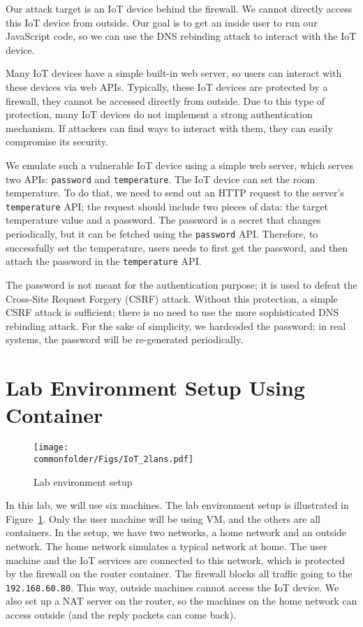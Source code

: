 Our attack target is an IoT device behind the firewall. We cannot directly
access this IoT device from outside. Our goal is to get an inside
user to run our JavaScript code, so we can use
the DNS rebinding attack to interact with the IoT device.


Many IoT devices have a simple built-in web server, so users can
interact with these devices via web APIs. Typically, these IoT
devices are protected by a firewall, they cannot be accessed directly
from outside. Due to this type of protection,  many IoT devices do not
implement a strong authentication mechanism. If attackers can find ways
to interact with them, they can easily compromise its security.

We emulate such a vulnerable IoT device using 
a simple web server, which serves
two APIs: \texttt{password} and \texttt{temperature}.
The IoT device can set the room temperature. To do that,
we need to send out an HTTP request to the server's
\texttt{temperature} API; the request should include
two pieces of data: the target temperature value and a
password.  The password is a secret that changes
periodically, but it can be fetched using
the \texttt{password} API. Therefore, to successfully
set the temperature, users needs to
first get the password, and then attach the password
in the \texttt{temperature} API.

The password is not meant for the authentication purpose; it is used to defeat the Cross-Site
Request Forgery (CSRF) attack. Without this protection, a simple CSRF attack is sufficient;
there is no need to use the more sophisticated DNS rebinding attack.
For the sake of simplicity, we hardcoded the
password; in real systems, the password will be re-generated periodically.




\section{Lab Environment Setup Using Container}



\begin{figure}[htb]
\centering
\texttt{[image: \\commonfolder/Figs/IoT\_2lans.pdf]}
\caption{Lab environment setup}
\label{rebind:fig:labsetup}
\end{figure}


In this lab, we will use six machines. 
The lab environment setup is illustrated
in Figure~\ref{rebind:fig:labsetup}. Only the user machine 
will be using VM, and the others are all containers. 
In the setup, we have two networks, a home network and 
an outside network. The home network 
simulates a typical network at home. 
The user machine and the IoT 
services are connected to this network, which
is protected by the firewall on the router container. 
The firewall blocks
all traffic going to the \texttt{192.168.60.80}. 
This way, outside machines cannot 
access the IoT device.
We also set up a NAT server on the router, so the machines
on the home network can access outside (and the reply
packets can come back). 


